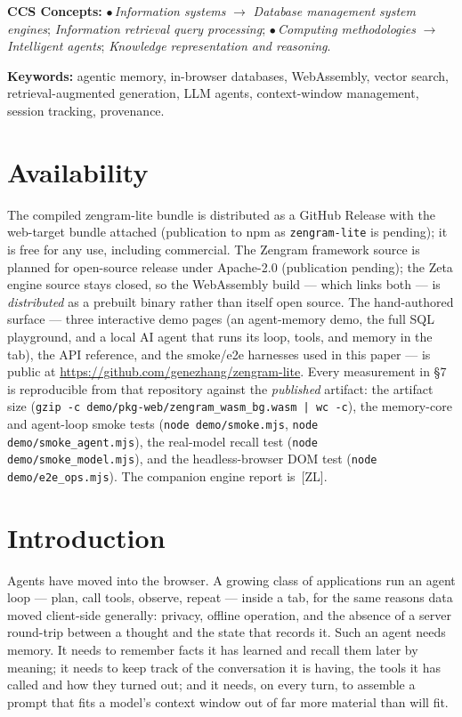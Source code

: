\documentclass[11pt]{article}
\newcommand{\code}[1]{\texttt{#1}}
\begin{document}
\begin{center}
\parbox{0.92\linewidth}{\small
\textbf{CCS Concepts:} $\bullet$\,\textit{Information systems} $\rightarrow$
\textit{Database management system engines}; \textit{Information retrieval query
processing}; $\bullet$\,\textit{Computing methodologies} $\rightarrow$
\textit{Intelligent agents}; \textit{Knowledge representation and reasoning}.

\smallskip
\textbf{Keywords:} agentic memory, in-browser databases, WebAssembly, vector
search, retrieval-augmented generation, LLM agents, context-window management,
session tracking, provenance.
}
\end{center}

\section*{Availability}

The compiled zengram-lite bundle is distributed as a GitHub Release with the
web-target bundle attached (publication to npm as \code{zengram-lite} is pending);
it is free for any use, including commercial. The Zengram framework source is
planned for open-source release under Apache-2.0 (publication pending); the Zeta
engine source stays closed, so the WebAssembly build --- which links both --- is
\emph{distributed} as a prebuilt binary rather than itself open source. The
hand-authored surface --- three
interactive demo pages (an agent-memory demo, the full SQL playground, and a
local AI agent that runs its loop, tools, and memory in the tab), the API
reference, and the smoke/e2e harnesses used in this paper --- is public at
\url{https://github.com/genezhang/zengram-lite}. Every measurement in \S7 is
reproducible from that repository against the \emph{published} artifact: the
artifact size (\code{gzip -c demo/pkg-web/zengram\_wasm\_bg.wasm | wc -c}), the
memory-core and agent-loop smoke tests (\code{node demo/smoke.mjs}, \code{node
demo/smoke\_agent.mjs}), the real-model recall test (\code{node
demo/smoke\_model.mjs}), and the headless-browser DOM test (\code{node
demo/e2e\_ops.mjs}). The companion engine report is~[ZL].

\section{Introduction}

Agents have moved into the browser. A growing class of applications run an agent
loop --- plan, call tools, observe, repeat --- inside a tab, for the same reasons
data moved client-side generally: privacy, offline operation, and the absence of
a server round-trip between a thought and the state that records it. Such an
agent needs memory. It needs to remember facts it has learned and recall them
later by meaning; it needs to keep track of the conversation it is having, the
tools it has called and how they turned out; and it needs, on every turn, to
assemble a prompt that fits a model's context window out of far more material
than will fit.
\end{document}
